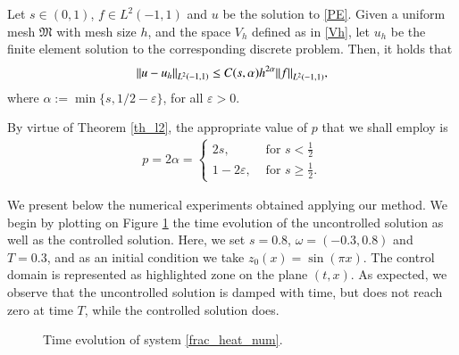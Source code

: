\begin{theorem}\label{th_l2}
Let $s\in(0,1)$, $f\in L^2(-1,1)$ and $u$ be the solution to \eqref{PE}. Given a uniform mesh $\mathfrak{M}$ with mesh size $h$,
and the space $V_h$ defined as in \eqref{Vh}, let $u_h$ be the finite element solution to the corresponding discrete 
problem. Then, it holds that
\begin{align*}
	{\left\|u-u_h\right\|}_{L^2(-1,1)}\leq C(s,\alpha)h^{2\alpha}{\left\|f\right\|}_{L^2(-1,1)},
\end{align*}
where $\alpha:=\min\{s, 1/2 -\varepsilon\}$, for all $\varepsilon>0$.
\end{theorem}
By virtue of Theorem \ref{th_l2}, the appropriate value of $p$ that we shall employ is
\begin{align*}
	p = 2\alpha = \begin{cases}
					2s, & \textrm{ for }s<\frac 12
					\\
					1-2\varepsilon, & \textrm{ for }s\geq \frac 12.
	\end{cases}
\end{align*}

We present below the numerical experiments obtained applying our method. We begin by plotting on Figure \ref{sol_surf} the time evolution of the uncontrolled solution as well as the controlled solution. Here, we set $s=0.8$, $\omega=(-0.3,0.8)$ and $T=0.3$, and as an initial condition we take $z_0(x) = \sin(\pi x)$. The control domain is represented as highlighted zone on the plane $(t,x)$. As expected, we observe that the uncontrolled solution is damped with time, but does not reach zero at time $T$, while the controlled solution does. 

\begin{figure}[ht]
 \centering
% 
%
\hspace{1 cm}
\caption{Time evolution of system \eqref{frac_heat_num}.}\label{sol_surf}
\end{figure}


